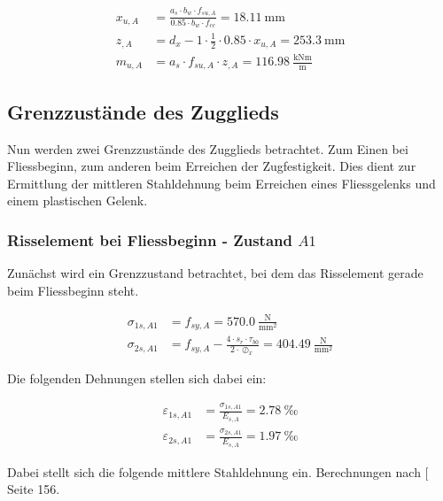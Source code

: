 \documentclass[
  11pt,
  letterpaper,
]{scrreprt}
\begin{document}
\[
\begin{aligned}
x_{u , A}& = \frac{a_{s} \cdot b_{w} \cdot f_{su , A}}{0.85 \cdot b_{w} \cdot f_{cc}} = 18.11 \ \mathrm{mm} \\ 
z_{, A}& = d_{x} - 1 \cdot \frac{1}{2} \cdot 0.85 \cdot x_{u , A} = 253.3 \ \mathrm{mm} \\ 
m_{u , A}& = a_{s} \cdot f_{su , A} \cdot z_{, A} = 116.98 \ \frac{\mathrm{kNm}}{\mathrm{m}} \end{aligned}
\]

\subsection{Grenzzustände des
Zugglieds}\label{grenzzustuxe4nde-des-zugglieds}

Nun werden zwei Grenzzustände des Zugglieds betrachtet. Zum Einen bei
Fliessbeginn, zum anderen beim Erreichen der Zugfestigkeit. Dies dient
zur Ermittlung der mittleren Stahldehnung beim Erreichen eines
Fliessgelenks und einem plastischen Gelenk.

\subsubsection{\texorpdfstring{Risselement bei Fliessbeginn - Zustand
\(A1\)}{Risselement bei Fliessbeginn - Zustand A1}}\label{risselement-bei-fliessbeginn---zustand-a1}

Zunächst wird ein Grenzzustand betrachtet, bei dem das Risselement
gerade beim Fliessbeginn steht.

\[
\begin{aligned}
\sigma_{1 s , A1}& = f_{sy , A} = 570.0 \ \frac{\mathrm{N}}{\mathrm{mm}^{2}} \\ 
\sigma_{2 s , A1}& = f_{sy , A} - \frac{4 \cdot s_{r} \cdot \tau_{b0}}{2 \cdot \oslash_{x}} = 404.49 \ \frac{\mathrm{N}}{\mathrm{mm}^{2}} \end{aligned}
\]

Die folgenden Dehnungen stellen sich dabei ein:

\[
\begin{aligned}
\varepsilon_{1 s , A1}& = \frac{\sigma_{1 s , A1}}{E_{s , A}} = 2.78 \ \mathrm{‰} \\ 
\varepsilon_{2 s , A1}& = \frac{\sigma_{2 s , A1}}{E_{s , A}} = 1.97 \ \mathrm{‰} \end{aligned}
\]

Dabei stellt sich die folgende mittlere Stahldehnung ein. Berechnungen
nach {[}\citeproc{ref-marti_tragverhalten_1999}{4}{]} Seite 156.
\end{document}
